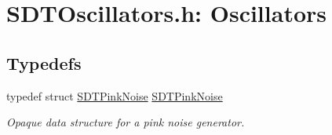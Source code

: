 \hypertarget{group__oscillators}{}\section{S\+D\+T\+Oscillators.\+h\+: Oscillators}
\label{group__oscillators}
\subsection*{Typedefs}
\begin{DoxyCompactItemize}
\item 
\hypertarget{group__oscillators_gac933fcdadc8959769a466840604f8f6c}{}typedef struct \hyperlink{group__oscillators_gac933fcdadc8959769a466840604f8f6c}{S\+D\+T\+Pink\+Noise} \hyperlink{group__oscillators_gac933fcdadc8959769a466840604f8f6c}{S\+D\+T\+Pink\+Noise}\label{group__oscillators_gac933fcdadc8959769a466840604f8f6c}

\begin{DoxyCompactList}\small\item\em Opaque data structure for a pink noise generator. \end{DoxyCompactList}\end{DoxyCompactItemize}
